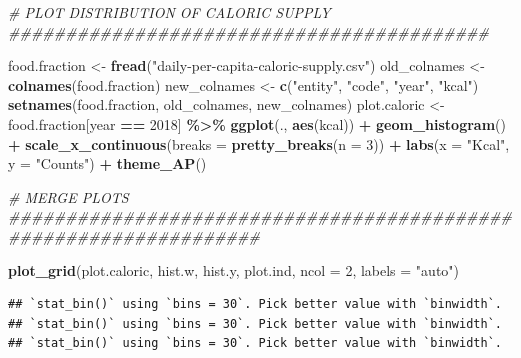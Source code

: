 \documentclass[
  11pt,
]{article}
\newenvironment{Shaded}{\begin{snugshade}}{\end{snugshade}}
\newcommand{\AttributeTok}[1]{\textcolor[rgb]{0.13,0.29,0.53}{#1}}
\newcommand{\CommentTok}[1]{\textcolor[rgb]{0.56,0.35,0.01}{\textit{#1}}}
\newcommand{\DecValTok}[1]{\textcolor[rgb]{0.00,0.00,0.81}{#1}}
\newcommand{\FunctionTok}[1]{\textcolor[rgb]{0.13,0.29,0.53}{\textbf{#1}}}
\newcommand{\NormalTok}[1]{#1}
\newcommand{\OtherTok}[1]{\textcolor[rgb]{0.56,0.35,0.01}{#1}}
\newcommand{\SpecialCharTok}[1]{\textcolor[rgb]{0.81,0.36,0.00}{\textbf{#1}}}
\newcommand{\StringTok}[1]{\textcolor[rgb]{0.31,0.60,0.02}{#1}}
\begin{document}
\begin{Shaded}
\begin{Highlighting}[]
\CommentTok{\# PLOT DISTRIBUTION OF CALORIC SUPPLY \#\#\#\#\#\#\#\#\#\#\#\#\#\#\#\#\#\#\#\#\#\#\#\#\#\#\#\#\#\#\#\#\#\#\#\#\#\#\#\#\#\#}

\NormalTok{food.fraction }\OtherTok{\textless{}{-}} \FunctionTok{fread}\NormalTok{(}\StringTok{"daily{-}per{-}capita{-}caloric{-}supply.csv"}\NormalTok{)}
\NormalTok{old\_colnames }\OtherTok{\textless{}{-}} \FunctionTok{colnames}\NormalTok{(food.fraction)}
\NormalTok{new\_colnames }\OtherTok{\textless{}{-}} \FunctionTok{c}\NormalTok{(}\StringTok{"entity"}\NormalTok{, }\StringTok{"code"}\NormalTok{, }\StringTok{"year"}\NormalTok{, }\StringTok{"kcal"}\NormalTok{)}
\FunctionTok{setnames}\NormalTok{(food.fraction, old\_colnames, new\_colnames)}
\NormalTok{plot.caloric }\OtherTok{\textless{}{-}}\NormalTok{ food.fraction[year }\SpecialCharTok{==} \DecValTok{2018}\NormalTok{] }\SpecialCharTok{\%\textgreater{}\%}
  \FunctionTok{ggplot}\NormalTok{(., }\FunctionTok{aes}\NormalTok{(kcal)) }\SpecialCharTok{+}
  \FunctionTok{geom\_histogram}\NormalTok{() }\SpecialCharTok{+} 
  \FunctionTok{scale\_x\_continuous}\NormalTok{(}\AttributeTok{breaks =} \FunctionTok{pretty\_breaks}\NormalTok{(}\AttributeTok{n =} \DecValTok{3}\NormalTok{)) }\SpecialCharTok{+}
  \FunctionTok{labs}\NormalTok{(}\AttributeTok{x =} \StringTok{"Kcal"}\NormalTok{, }\AttributeTok{y =} \StringTok{"Counts"}\NormalTok{) }\SpecialCharTok{+}
  \FunctionTok{theme\_AP}\NormalTok{()}
\end{Highlighting}
\end{Shaded}

\begin{Shaded}
\begin{Highlighting}[]
\CommentTok{\# MERGE PLOTS \#\#\#\#\#\#\#\#\#\#\#\#\#\#\#\#\#\#\#\#\#\#\#\#\#\#\#\#\#\#\#\#\#\#\#\#\#\#\#\#\#\#\#\#\#\#\#\#\#\#\#\#\#\#\#\#\#\#\#\#\#\#\#\#\#\#}

\FunctionTok{plot\_grid}\NormalTok{(plot.caloric, hist.w, hist.y, plot.ind, }\AttributeTok{ncol =} \DecValTok{2}\NormalTok{, }\AttributeTok{labels =} \StringTok{"auto"}\NormalTok{)}
\end{Highlighting}
\end{Shaded}

\begin{verbatim}
## `stat_bin()` using `bins = 30`. Pick better value with `binwidth`.
## `stat_bin()` using `bins = 30`. Pick better value with `binwidth`.
## `stat_bin()` using `bins = 30`. Pick better value with `binwidth`.
\end{verbatim}
\end{document}
